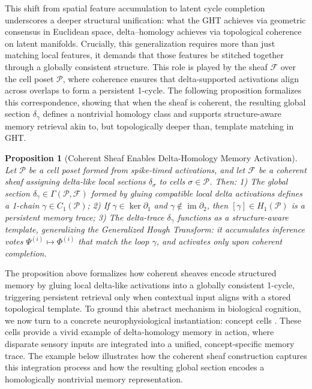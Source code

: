 \documentclass[lettersize,journal]{IEEEtran}
\newtheorem{proposition}{Proposition}
\begin{document}
This shift from spatial feature accumulation to latent cycle completion underscores a deeper structural unification: what the GHT achieves via geometric consensus in Euclidean space, delta–homology achieves via topological coherence on latent manifolds. Crucially, this generalization requires more than just matching local features, it demands that those features be stitched together through a globally consistent structure. This role is played by the sheaf \( \mathcal{F} \) over the cell poset \( \mathcal{P} \), where coherence ensures that delta-supported activations align across overlaps to form a persistent 1-cycle. The following proposition formalizes this correspondence, showing that when the sheaf is coherent, the resulting global section \( \delta_\gamma \) defines a nontrivial homology class and supports structure-aware memory retrieval akin to, but topologically deeper than, template matching in GHT.


\begin{proposition}[Coherent Sheaf Enables Delta-Homology Memory Activation]
Let \( \mathcal{P} \) be a cell poset formed from spike-timed activations, and let \( \mathcal{F} \) be a coherent sheaf assigning delta-like local sections \( \delta_\sigma \) to cells \( \sigma \in \mathcal{P} \). Then:
1) The global section \( \delta_\gamma \in \Gamma(\mathcal{P}, \mathcal{F}) \) formed by gluing compatible local delta activations defines a 1-chain \( \gamma \in C_1(\mathcal{P}) \);
2) If \( \gamma \in \ker \partial_1 \) and \( \gamma \notin \operatorname{im} \partial_2 \), then \( [\gamma] \in H_1(\mathcal{P}) \) is a persistent memory trace;
3) The delta-trace \( \delta_\gamma \) functions as a structure-aware template, generalizing the Generalized Hough Transform: it accumulates inference votes \( \Psi^{(i)} \mapsto \Phi^{(i)} \) that match the loop \( \gamma \), and activates only upon coherent completion.
\end{proposition}

The proposition above formalizes how coherent sheaves encode structured memory by gluing local delta-like activations into a globally consistent 1-cycle, triggering persistent retrieval only when contextual input aligns with a stored topological template. To ground this abstract mechanism in biological cognition, we now turn to a concrete neurophysiological instantiation: concept cells \cite{quiroga2005invariant}. These cells provide a vivid example of delta-homology memory in action, where disparate sensory inputs are integrated into a unified, concept-specific memory trace. The example below illustrates how the coherent sheaf construction captures this integration process and how the resulting global section encodes a homologically nontrivial memory representation.
\end{document}
